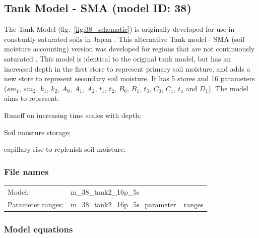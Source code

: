 \subsection{Tank Model - SMA (model ID: 38)}
The Tank Model (fig.~\ref{fig:38_schematic}) is originally developed for use in constantly saturated soils in Japan \citep{Sugawara1979}. This alternative Tank model - SMA (soil moisture accounting) version was developed for regions that are not continuously saturated \citep{Sugawara1995}. This model is identical to the original tank model, but has an increased depth in the first store to represent primary soil moisture, and adds a new store to represent secondary soil moisture. It has 5 stores and 16 parameters ($sm_1$, $sm_2$, $k_1$, $k_2$, $A_0$, $A_1$, $A_2$, $t_1$, $t_2$, $B_0$, $B_1$, $t_3$, $C_0$, $C_1$, $t_4$ and $D_1$). The model aims to represent:

\begin{itemizecompact}
\item Runoff on increasing time scales with depth;
\item Soil moisture storage;
\item capillary rise to replenish soil moisture.
\end{itemizecompact}

\subsubsection{File names}
\begin{tabular}{@{}ll}
Model: &m\_38\_tank2\_16p\_5s \\
Parameter ranges: &m\_38\_tank2\_16p\_5s\_parameter\_ ranges \\
\end{tabular}

\subsubsection{Model equations}

